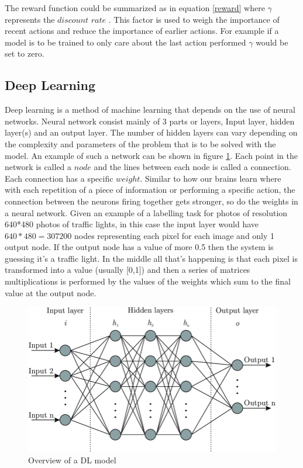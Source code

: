 \documentclass[conference]{IEEEtran}
\begin{document}
The reward function could be summarized as in equation \ref{reward} where $\gamma$ represents the $discount$ $rate$ . This factor is used to weigh the importance of recent actions and reduce the importance of earlier actions. For example if a model is to be trained to only care about the last action performed $\gamma$ would be set to zero.

\subsection{Deep Learning}

Deep learning is a method of machine learning that depends on the use of neural networks\cite{kelleher2019deep}. Neural network consist mainly of 3 parts or layers, Input layer, hidden layer(s) and an output layer. The number of hidden layers can vary depending on the complexity and parameters of the problem that is to be solved with the model. An example of such a network can be shown in figure \ref{fig:nn}. Each point in the network is called a $node$ and the lines between each node is called a connection. Each connection has a specific $weight$. Similar to how our brains learn where with each repetition of a piece of information or performing a specific action, the connection between the neurons firing together gets stronger, so do the weights in a neural network. Given an example of a labelling task for photos of resolution 640*480 photos of traffic lights, in this case the input layer would have $640*480=307200$ nodes representing each pixel for each image and only 1 output node. If the output node has a value of more 0.5 then the system is guessing it's a traffic light. In the middle all that's happening is that each pixel is transformed into a value (usually [0,1]) and then a series of matrices multiplications is performed by the values of the weights which sum to the final value at the output node.
\begin{figure}[h!]
	\centering
	\includegraphics[width=1\linewidth]{nn.png}
	\caption{Overview of a DL model\cite{article}}
	\label{fig:nn}
\end{figure}
\end{document}
